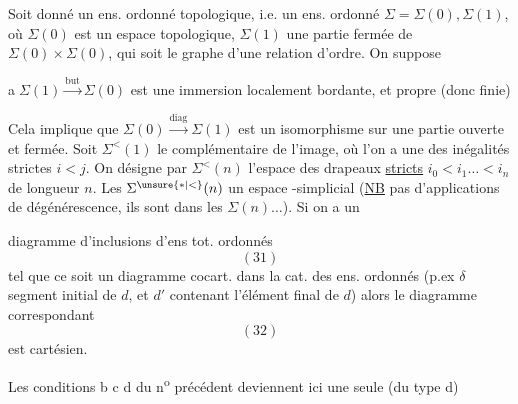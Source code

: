 Soit donné un ens. ordonné topologique, i.e. un  ens. ordonné $\Sigma=\Sigma(0),\Sigma(1)$, où $\Sigma(0)$ est un espace topologique, $\Sigma(1)$ une partie fermée de $\Sigma(0)\times\Sigma(0)$, qui soit le graphe d'une relation d'ordre. On suppose

\textcircled{a}\quad $\Sigma(1)\xrightarrow{\mathrm{but}}\Sigma(0)$ est une immersion localement bordante, et propre (donc finie)

 Cela implique que $\Sigma(0)\xrightarrow{\mathrm{diag}}\Sigma(1)$ est un isomorphisme sur une partie ouverte et fermée. Soit $\Sigma^{<}(1)$ le complémentaire de l'image, où l'on a une des inégalités strictes $i<j$. On désigne par $\Sigma^{<}(n)$ l'espace des drapeaux \uline{stricts} $i_0<i_1\ldots<i_n$ de longueur $n$. Les $\Sigma^{\unsure{*|<}}(n)$  un espace -simplicial (\uline{NB} pas d'applications de dégénérescence,  ils sont dans les $\Sigma(n)\ldots$).  Si on a un

diagramme d'inclusions  d'ens tot. ordonnés
\[
(31)
\]
tel que ce soit un diagramme cocart. dans la cat. des ens. ordonnés (p.ex $\delta$ segment initial de $d$, et $d'$ contenant l'élément final de $d$) alors le diagramme correspondant
\[
(32)
\]
est cartésien. 

Les conditions b c d du n\textsuperscript{o} précédent deviennent ici une seule (du type d)

